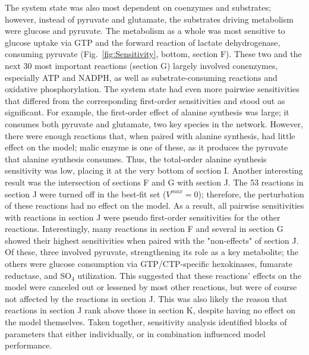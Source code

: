 \documentclass[12pt]{article}
\begin{document}
The system state was also most dependent on coenzymes and substrates; however, instead of pyruvate and glutamate, the substrates driving metabolism were glucose and pyruvate. 
The metabolism as a whole was most sensitive to glucose uptake via GTP and the forward reaction of lactate dehydrogenase, consuming pyruvate (Fig.~\ref{fig:Sensitivity}, bottom, section F).
These two and the next 30 most important reactions (section G) largely involved conenzymes, especially ATP and NADPH, as well as substrate-consuming reactions and oxidative phosphorylation.  
The system state had even more pairwise sensitivities that differed from the corresponding first-order sensitivities and stood out as significant.
For example, the first-order effect of alanine synthesis was large; it consumes both pyruvate and glutamate, two key species in the network.
However, there were enough reactions that, when paired with alanine synthesis, had little effect on the model; malic enzyme is one of these, as it produces the pyruvate that alanine synthesis consumes.
Thus, the total-order alanine synthesis sensitivity was low, placing it at the very bottom of section I.
Another interesting result was the intersection of sections F and G with section J.
The 53 reactions in section J were turned off in the best-fit set ($V^{max}=0$);
therefore, the perturbation of these reactions had no effect on the model.
As a result, all pairwise sensitivities with reactions in section J were pseudo first-order sensitivities for the other reactions.
Interestingly, many reactions in section F and several in section G showed their highest sensitivities when paired with the "non-effects" of section J.
Of these, three involved pyruvate, strengthening its role as a key metabolite; the others were glucose consumption via GTP/CTP-specific hexokinases,
fumarate reductase, and SO$_4$ utilization.
This suggested that these reactions' effects on the model were canceled out or lessened by most other reactions, but were of course not affected by the reactions in section J.
This was also likely the reason that reactions in section J rank above those in section K, despite having no effect on the model themselves.
Taken together, sensitivity analysis identified blocks of parameters that either individually, or in combination influenced model performance.
\end{document}
